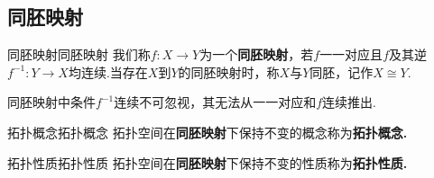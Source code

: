 \documentclass{ctexart}
\begin{document}
\subsection{同胚映射}
\begin{定义}{同胚映射}{同胚映射}
	我们称$f:X \rightarrow Y$为一个\textbf{同胚映射}，若$f$一一对应且$f$及其逆$f^{-1}:Y \rightarrow X$均连续.当存在$X$到$Y$的同胚映射时，称$X$与$Y$同胚，记作$ X \cong Y.$
\end{定义}
\begin{提醒}
	同胚映射中条件$f^{-1}$连续不可忽视，其无法从一一对应和$f$连续推出.
\end{提醒}
\begin{定义}{拓扑概念}{拓扑概念}
	拓扑空间在\textbf{同胚映射}下保持不变的概念称为\textbf{拓扑概念.}
\end{定义}
\begin{定义}{拓扑性质}{拓扑性质}
	拓扑空间在\textbf{同胚映射}下保持不变的性质称为\textbf{拓扑性质.}
\end{定义}
\end{document}
